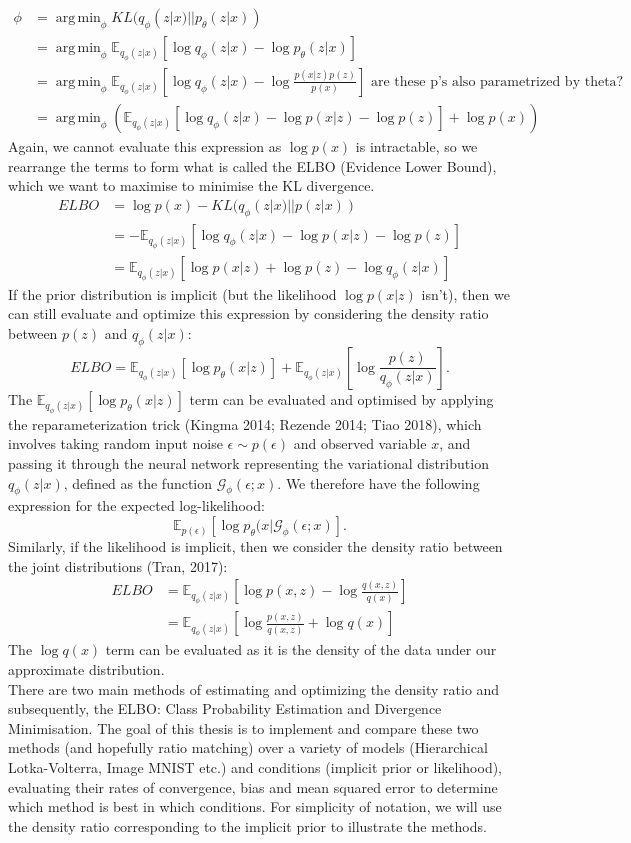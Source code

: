 \documentclass[a4paper,12pt]{article}
\DeclareMathOperator*{\argmin}{arg\,min}
\begin{document}
\begin{align*}
\phi &=\argmin_\phi KL(q_\phi(z|x)||p_\theta (z|x))\\
&= \argmin_\phi \mathbb{E}_{q_\phi (z|x)}\left[\log q_\phi(z|x)-\log p_\theta(z|x)\right]\\
&=\argmin_\phi\mathbb{E}_{q_\phi (z|x)}\left[\log q_\phi(z|x)-\log \frac{p(x|z)p(z)}{p(x)}\right] \text{ are these p's also parametrized by theta?}\\
&=\argmin_\phi\left(\mathbb{E}_{q_\phi (z|x)}\left[\log q_\phi(z|x)-\log p(x|z)-\log p(z)\right]+\log p(x)\right)
\end{align*}
Again, we cannot evaluate this expression as $\log p(x)$ is intractable, so we rearrange the terms to form what is called the ELBO (Evidence Lower Bound), which we want to maximise to minimise the KL divergence.
\begin{align*}
ELBO&=\log p(x)-KL(q_\phi(z|x)||p(z|x))\\
&=-\mathbb{E}_{q_\phi(z|x)}\left[\log q_\phi(z|x)-\log p(x|z)-\log p(z)\right]\\
&=\mathbb{E}_{q_\phi(z|x)}\left[\log p(x|z)+\log p(z)-\log q_\phi(z|x)\right]
\end{align*}
If the prior distribution is implicit (but the likelihood $\log p(x|z)$ isn't), then we can still evaluate and optimize this expression by considering the density ratio between $p(z)$ and $q_\phi (z|x)$:
\[ELBO = \mathbb{E}_{q_\phi(z|x)}\left[\log p_\theta(x|z)\right]+\mathbb{E}_{q_\phi(z|x)}\left[\log \frac{p(z)}{q_\phi(z|x)}\right].\]
The $\mathbb{E}_{q_\phi(z|x)}\left[\log p_\theta(x|z)\right]$ term can be evaluated and optimised by applying the reparameterization trick (Kingma 2014; Rezende 2014; Tiao 2018), which involves taking random input noise $\epsilon\sim p(\epsilon)$ and observed variable $x$, and passing it through the neural network representing the variational distribution $q_\phi(z|x)$, defined as the function $\mathcal{G}_\phi(\epsilon;x)$. We therefore have the following expression for the expected log-likelihood:
\[\mathbb{E}_{p(\epsilon)}[\log p_\theta (x|\mathcal{G}_\phi(\epsilon;x)].\]
Similarly, if the likelihood is implicit, then we consider the density ratio between the joint distributions (Tran, 2017):
\begin{align*}
ELBO&= \mathbb{E}_{q_\phi(z|x)}\left[\log p(x,z)-\log \frac{q(x,z)}{q(x)}\right]\\
&= \mathbb{E}_{q_\phi(z|x)}\left[\log \frac{p(x,z)}{q(x,z)}+\log q(x)\right]
\end{align*}
The $\log q(x)$ term can be evaluated as it is the density of the data under our approximate distribution.\\
There are two main methods of estimating and optimizing the density ratio and subsequently, the ELBO: Class Probability Estimation and Divergence Minimisation. The goal of this thesis is to implement and compare these two methods (and hopefully ratio matching) over a variety of models (Hierarchical Lotka-Volterra, Image MNIST etc.) and conditions (implicit prior or likelihood), evaluating their rates of convergence, bias and mean squared error to determine which method is best in which conditions. For simplicity of notation, we will use the density ratio corresponding to the implicit prior to illustrate the methods.
\newpage
\end{document}

